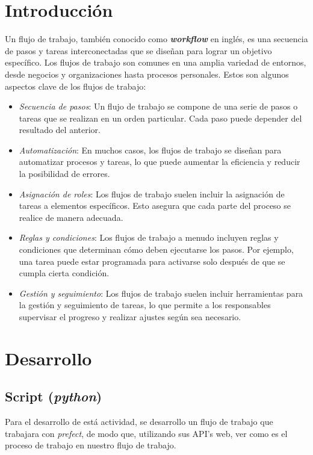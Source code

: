 \documentclass{dense_template}
\begin{document}
\maketitle
\tableofcontents
\newpage
\section{Introducción}
Un flujo de trabajo, también conocido como \textit{\textbf{workflow}} en inglés, es una secuencia de pasos y tareas interconectadas que se diseñan para lograr un objetivo específico. Los flujos de trabajo son comunes en una amplia variedad de entornos, desde negocios y organizaciones hasta procesos personales. Estos son algunos aspectos clave de los flujos de trabajo:
\begin{itemize}
    \item \textit{Secuencia de pasos}: Un flujo de trabajo se compone de una serie de pasos o tareas que se realizan en un orden particular. Cada paso puede depender del resultado del anterior.
    \item \textit{Automatización}: En muchos casos, los flujos de trabajo se diseñan para automatizar procesos y tareas, lo que puede aumentar la eficiencia y reducir la posibilidad de errores.
    \item \textit{Asignación de roles}: Los flujos de trabajo suelen incluir la asignación de tareas a elementos específicos. Esto asegura que cada parte del proceso se realice de manera adecuada.
    \item \textit{Reglas y condiciones}: Los flujos de trabajo a menudo incluyen reglas y condiciones que determinan cómo deben ejecutarse los pasos. Por ejemplo, una tarea puede estar programada para activarse solo después de que se cumpla cierta condición.
    \item \textit{Gestión y seguimiento}: Los flujos de trabajo suelen incluir herramientas para la gestión y seguimiento de tareas, lo que permite a los responsables supervisar el progreso y realizar ajustes según sea necesario.
\end{itemize}

\section{Desarrollo}
\subsection{Script (\textit{python})}
Para el desarrollo de está actividad, se desarrollo un flujo de trabajo que trabajara con \textit{prefect}, de modo que, utilizando sus API's web, ver como es el proceso de trabajo en nuestro flujo de trabajo.
\end{document}
